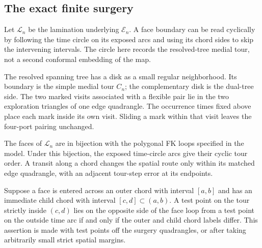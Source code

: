 \subsection{The exact finite surgery}

Let $\mathcal L_n$ be the lamination underlying $\mathcal E_n$.  A face
boundary can be read cyclically by following the time circle on its
exposed arcs and using its chord sides to skip the intervening intervals.
The circle here records the resolved-tree medial tour, not a second
conformal embedding of the map.

The resolved spanning tree has a disk as a small regular neighborhood.
Its boundary is the simple medial tour $C_n$; the complementary disk
is the dual-tree side.  The two marked visits associated with a flexible
pair lie in the two exploration triangles of one edge quadrangle.
The occurrence times fixed above place each mark inside its own visit.
Sliding a mark within that visit leaves the four-port pairing unchanged.

\begin{lemma}\label{loop:surgery}
The faces of $\mathcal L_n$ are in bijection with the polygonal FK loops
specified in the model.  Under this bijection, the exposed time-circle
arcs give their cyclic tour order.  A transit along a chord changes the
spatial route only within its matched edge quadrangle, with an adjacent
tour-step error at its endpoints.

Suppose a face is entered across an outer chord with interval $[a,b]$ and
has an immediate child chord with interval $[c,d]\subset(a,b)$.  A test
point on the tour strictly inside $(c,d)$ lies on the opposite side of the
face loop from a test point on the outside time arc if and only if the
outer and child chord labels differ.  This assertion is made with test
points off the surgery quadrangles, or after taking arbitrarily small
strict spatial margins.
\end{lemma}

